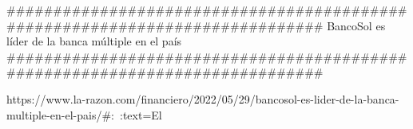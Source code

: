 #############################################################################
BancoSol es líder de la banca múltiple en el país
#############################################################################

https://www.la-razon.com/financiero/2022/05/29/bancosol-es-lider-de-la-banca-multiple-en-el-pais/#:~:text=El%


